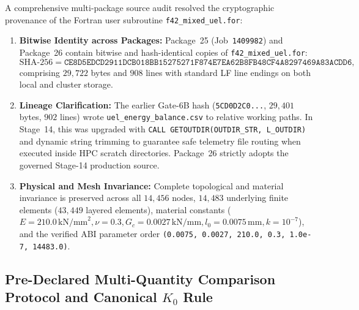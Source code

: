 A comprehensive multi-package source audit resolved the cryptographic provenance of the Fortran user subroutine \texttt{f42\_mixed\_uel.for}:
\begin{enumerate}
    \item \textbf{Bitwise Identity across Packages:} Package~25 (Job~\texttt{1409982}) and Package~26 contain bitwise and hash-identical copies of \texttt{f42\_mixed\_uel.for}:
    \begin{equation}
    \mathrm{SHA\text{-}256} = \texttt{CE8D5EDCD2911DCB018BB15275271F874E7EA62B8FB48CF4A8297469A83ACDD6},
    \end{equation}
    comprising $29{,}722$ bytes and $908$ lines with standard LF line endings on both local and cluster storage.
    \item \textbf{Lineage Clarification:} The earlier Gate-6B hash (\texttt{5CD0D2C0...}, $29{,}401$ bytes, $902$ lines) wrote \texttt{uel\_energy\_balance.csv} to relative working paths. In Stage~14, this was upgraded with \texttt{CALL GETOUTDIR(OUTDIR\_STR, L\_OUTDIR)} and dynamic string trimming to guarantee safe telemetry file routing when executed inside HPC scratch directories. Package~26 strictly adopts the governed Stage-14 production source.
    \item \textbf{Physical and Mesh Invariance:} Complete topological and material invariance is preserved across all $14{,}456$ nodes, $14{,}483$ underlying finite elements ($43{,}449$ layered elements), material constants ($E = 210.0\,\mathrm{kN/mm}^2, \nu = 0.3, G_c = 0.0027\,\mathrm{kN/mm}, l_0 = 0.0075\,\mathrm{mm}, k = 10^{-7}$), and the verified ABI parameter order \texttt{(0.0075, 0.0027, 210.0, 0.3, 1.0e-7, 14483.0)}.
\end{enumerate}

\subsection{Pre-Declared Multi-Quantity Comparison Protocol and Canonical \texorpdfstring{$K_0$}{K0} Rule}
\label{subsec:stage14ur_comparison_protocol}


